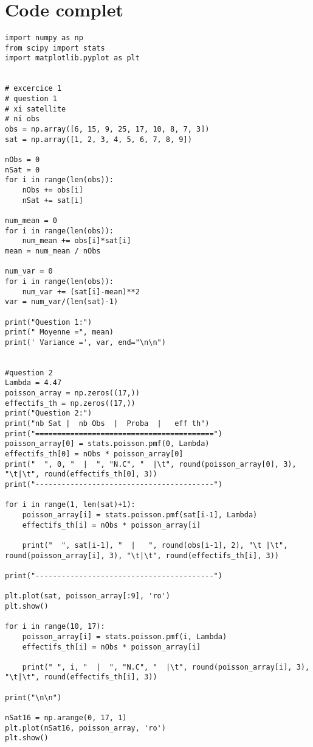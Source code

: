 \clearpage
\section{Code complet}
\begin{lstlisting}[style=myPython, caption=Code Python complet TP5, frame=lines]
import numpy as np
from scipy import stats
import matplotlib.pyplot as plt


# excercice 1
# question 1
# xi satellite
# ni obs
obs = np.array([6, 15, 9, 25, 17, 10, 8, 7, 3])
sat = np.array([1, 2, 3, 4, 5, 6, 7, 8, 9])

nObs = 0
nSat = 0
for i in range(len(obs)):
    nObs += obs[i]
    nSat += sat[i]

num_mean = 0
for i in range(len(obs)):
    num_mean += obs[i]*sat[i]
mean = num_mean / nObs

num_var = 0
for i in range(len(obs)):
    num_var += (sat[i]-mean)**2
var = num_var/(len(sat)-1)

print("Question 1:")
print(" Moyenne =", mean)
print(' Variance =', var, end="\n\n")


#question 2
Lambda = 4.47
poisson_array = np.zeros((17,))
effectifs_th = np.zeros((17,))
print("Question 2:")
print("nb Sat |  nb Obs  |  Proba  |   eff th")
print("=========================================")
poisson_array[0] = stats.poisson.pmf(0, Lambda)
effectifs_th[0] = nObs * poisson_array[0]
print("  ", 0, "  |  ", "N.C", "  |\t", round(poisson_array[0], 3), "\t|\t", round(effectifs_th[0], 3))
print("-----------------------------------------")

for i in range(1, len(sat)+1):
    poisson_array[i] = stats.poisson.pmf(sat[i-1], Lambda)
    effectifs_th[i] = nObs * poisson_array[i]

    print("  ", sat[i-1], "  |   ", round(obs[i-1], 2), "\t |\t", round(poisson_array[i], 3), "\t|\t", round(effectifs_th[i], 3))

print("-----------------------------------------")

plt.plot(sat, poisson_array[:9], 'ro')
plt.show()

for i in range(10, 17):
    poisson_array[i] = stats.poisson.pmf(i, Lambda)
    effectifs_th[i] = nObs * poisson_array[i]

    print(" ", i, "  |  ", "N.C", "  |\t", round(poisson_array[i], 3), "\t|\t", round(effectifs_th[i], 3))

print("\n\n")

nSat16 = np.arange(0, 17, 1)
plt.plot(nSat16, poisson_array, 'ro')
plt.show()



\end{lstlisting}
